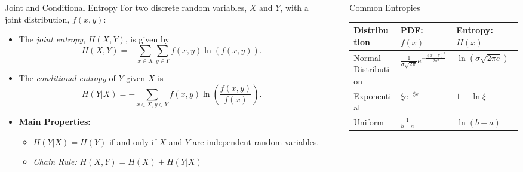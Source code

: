 \documentclass[final]{beamer}
\newlength{\sepwid}
\newlength{\onecolwid}
\begin{document}
\begin{frame}[t]
\begin{columns}[t]
\begin{column}{\onecolwid}
        \begin{block}{{Joint and Conditional Entropy}}
        For two discrete random variables, $X$ and $Y$, with a joint distribution, $f(x,y)$:
            \begin{itemize}
                \item The {\it joint entropy}, $H(X,Y)$, is given by
                \begin{displaymath}
                    H(X, Y) = -\sum_{x\in X}\sum_{y \in Y}f(x,y)\ln(f(x,y)).
                \end{displaymath}
                \item The {\it conditional entropy} of $Y$ given $X$ is 
                    \begin{displaymath}
                        H(Y|X) = - \sum_{x\in X , y\in Y}f(x,y)\ln \left(\frac{f(x,y)}{f(x)}\right). 
                    \end{displaymath}
                    \item \textbf{Main Properties:} 
                   \begin{itemize} 
                \item $H(Y|X)=H(Y)$ if and only if $X$ and $Y$ are independent random variables. 
                \item {\it Chain Rule:} $H(X,Y) = H(X) + H(Y|X)$
                    
                \end{itemize} 
            \end{itemize}    
        \end{block}
    \end{column}
       \begin{column}{\sepwid}\end{column}		%
    \begin{column}{\onecolwid}
    
    \begin{block}{Common Entropies}
         \begin{tabular}{ |p{12cm}||p{12cm}|p{12cm}|  }
    \hline
    \textbf{Distribution}& \textbf{PDF}: $f(x)$& \textbf{Entropy}: $H(x)$\\
    \hline
    Normal Distribution & ${\frac{1}{\sigma \sqrt{2\pi}}e^{-\frac{(x-\pi)^2}{2\sigma ^2}}}$    & $\ln (\sigma\sqrt{2\pi e})$\\
    Exponential&   $\xi e^{-\xi x}$  & $1-\ln\xi$\\
    Uniform&$\frac{1}{b-a}$ & $\ln(b-a)$\\
    

\end{tabular}
\end{block}
\end{column}
\end{columns}
\end{frame}
\end{document}
